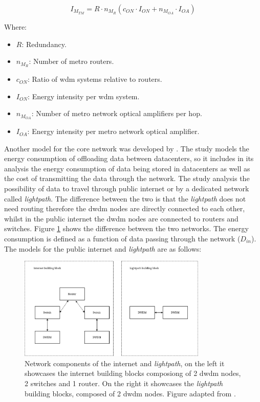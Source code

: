 \begin{equation}
\label{formula:schien_core_metro}
    I_{M_{TM}} = R \cdot n_{M_R} (c_{ON} \cdot I_{ON} + n_{M_{OA}} \cdot I_{OA})
\end{equation}

Where:

\begin{itemize}
    \item $R$: Redundancy.
    \item $n_{M_R}$: Number of metro routers.
    \item $c_{ON}$: Ratio of \ac{wdm} systems relative to routers.
    \item $I_{ON}$: Energy intensity per \ac{wdm} system.
    \item $n_{M_{OA}}$: Number of metro network optical amplifiers per hop.
    \item $I_{OA}$: Energy intensity per metro network optical amplifier.
\end{itemize}



Another model for the core network was developed by \citet{Taal2014}. The study models the energy consumption of offloading data between datacenters, so it includes in  its analysis the energy consumption of data being stored in datacenters as well as the cost of transmitting the data through the network. 
The study analysis the possibility of data to travel through public internet or by a dedicated network called \textit{lightpath}. The difference between the two is that the \textit{lightpath} does not need routing therefore the \ac{dwdm} nodes are directly connected to each other, whilst in the public internet the \ac{dwdm} nodes are connected to routers and switches. Figure \ref{figure:tall2014_network_components} shows the difference between the two networks. The energy consumption is defined as a function of data passing through the network ($D_{in}$). The models for the public internet and \textit{lightpath} are as follows:

\begin{figure}[h] 
    \centering
    \includegraphics[width=0.8\textwidth]{figs/taal2014.png}
    \caption[Network components of the internet and \textit{lightpath}] {Network components of the internet and \textit{lightpath}, on the left it showcases the internet building blocks composiong of 2 \ac{dwdm} nodes, 2 switches and 1 router. On the right it showcases the \textit{lightpath} building blocks, composed of 2 \ac{dwdm} nodes. Figure adapted from \citet{Taal2014}.}
    \label{figure:tall2014_network_components}
\end{figure}
 
